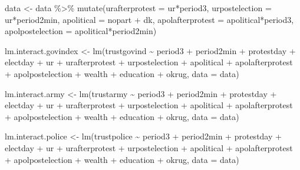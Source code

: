\documentclass[
  letterpaper,
  DIV=11,
  numbers=noendperiod]{scrartcl}
\newenvironment{Shaded}{\begin{snugshade}}{\end{snugshade}}
\newcommand{\AttributeTok}[1]{\textcolor[rgb]{0.40,0.45,0.13}{#1}}
\newcommand{\FunctionTok}[1]{\textcolor[rgb]{0.28,0.35,0.67}{#1}}
\newcommand{\NormalTok}[1]{\textcolor[rgb]{0.00,0.23,0.31}{#1}}
\newcommand{\OtherTok}[1]{\textcolor[rgb]{0.00,0.23,0.31}{#1}}
\newcommand{\SpecialCharTok}[1]{\textcolor[rgb]{0.37,0.37,0.37}{#1}}
\begin{document}
\begin{Shaded}
\begin{Highlighting}[]
\NormalTok{data }\OtherTok{\textless{}{-}}\NormalTok{ data }\SpecialCharTok{\%\textgreater{}\%} 
  \FunctionTok{mutate}\NormalTok{(}\AttributeTok{urafterprotest =}\NormalTok{ ur}\SpecialCharTok{*}\NormalTok{period3,}
         \AttributeTok{urpostelection =}\NormalTok{ ur}\SpecialCharTok{*}\NormalTok{period2min,}
         \AttributeTok{apolitical =}\NormalTok{ nopart }\SpecialCharTok{+}\NormalTok{ dk,}
         \AttributeTok{apolafterprotest =}\NormalTok{ apolitical}\SpecialCharTok{*}\NormalTok{period3,}
         \AttributeTok{apolpostelection =}\NormalTok{ apolitical}\SpecialCharTok{*}\NormalTok{period2min)}

\NormalTok{lm.interact.govindex }\OtherTok{\textless{}{-}} \FunctionTok{lm}\NormalTok{(trustgovind }\SpecialCharTok{\textasciitilde{}}\NormalTok{ period3 }\SpecialCharTok{+}\NormalTok{ period2min }\SpecialCharTok{+}\NormalTok{ protestday }\SpecialCharTok{+}\NormalTok{ electday }\SpecialCharTok{+} 
\NormalTok{                                ur }\SpecialCharTok{+}\NormalTok{ urafterprotest }\SpecialCharTok{+}\NormalTok{ urpostelection }\SpecialCharTok{+} 
\NormalTok{                                apolitical }\SpecialCharTok{+}\NormalTok{ apolafterprotest }\SpecialCharTok{+}\NormalTok{ apolpostelection }\SpecialCharTok{+}
\NormalTok{                                wealth }\SpecialCharTok{+}\NormalTok{ education }\SpecialCharTok{+}\NormalTok{ okrug, }\AttributeTok{data =}\NormalTok{ data) }

\NormalTok{lm.interact.army }\OtherTok{\textless{}{-}} \FunctionTok{lm}\NormalTok{(trustarmy }\SpecialCharTok{\textasciitilde{}}\NormalTok{ period3 }\SpecialCharTok{+}\NormalTok{ period2min }\SpecialCharTok{+}\NormalTok{ protestday }\SpecialCharTok{+}\NormalTok{ electday }\SpecialCharTok{+} 
\NormalTok{                                ur }\SpecialCharTok{+}\NormalTok{ urafterprotest }\SpecialCharTok{+}\NormalTok{ urpostelection }\SpecialCharTok{+} 
\NormalTok{                                apolitical }\SpecialCharTok{+}\NormalTok{ apolafterprotest }\SpecialCharTok{+}\NormalTok{ apolpostelection }\SpecialCharTok{+}
\NormalTok{                                wealth }\SpecialCharTok{+}\NormalTok{ education }\SpecialCharTok{+}\NormalTok{ okrug, }\AttributeTok{data =}\NormalTok{ data) }

\NormalTok{lm.interact.police }\OtherTok{\textless{}{-}} \FunctionTok{lm}\NormalTok{(trustpolice }\SpecialCharTok{\textasciitilde{}}\NormalTok{ period3 }\SpecialCharTok{+}\NormalTok{ period2min }\SpecialCharTok{+}\NormalTok{ protestday }\SpecialCharTok{+}\NormalTok{ electday }\SpecialCharTok{+} 
\NormalTok{                                ur }\SpecialCharTok{+}\NormalTok{ urafterprotest }\SpecialCharTok{+}\NormalTok{ urpostelection }\SpecialCharTok{+} 
\NormalTok{                                apolitical }\SpecialCharTok{+}\NormalTok{ apolafterprotest }\SpecialCharTok{+}\NormalTok{ apolpostelection }\SpecialCharTok{+}
\NormalTok{                                wealth }\SpecialCharTok{+}\NormalTok{ education }\SpecialCharTok{+}\NormalTok{ okrug, }\AttributeTok{data =}\NormalTok{ data) }


\end{Highlighting}
\end{Shaded}
\end{document}
